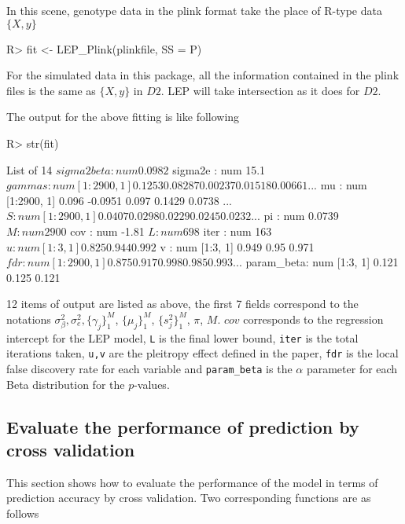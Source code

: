 \documentclass[11pt]{article}
\begin{document}
In this scene,  genotype data in the plink format take the place of R-type data $\{X, y\}$
\begin{Schunk}
\begin{Sinput}
R> fit <- LEP_Plink(plinkfile, SS = P)
\end{Sinput}
\end{Schunk}
For the simulated data in this package, all the information contained in the plink files is the same as $\{X, y\}$ in $D2$. LEP will take intersection as it does for $D2$.



The output for the above fitting is like following
\begin{Schunk}
\begin{Sinput}
R> str(fit)
\end{Sinput}
\begin{Soutput}
List of 14
 $ sigma2beta: num 0.0982
 $ sigma2e   : num 15.1
 $ gammas    : num [1:2900, 1] 0.1253 0.08287 0.00237 0.01518 0.00661 ...
 $ mu        : num [1:2900, 1] 0.096 -0.0951 0.097 0.1429 0.0738 ...
 $ S         : num [1:2900, 1] 0.0407 0.0298 0.0229 0.0245 0.0232 ...
 $ pi        : num 0.0739
 $ M         : num 2900
 $ cov       : num -1.81
 $ L         : num 698
 $ iter      : num 163
 $ u         : num [1:3, 1] 0.825 0.944 0.992
 $ v         : num [1:3, 1] 0.949 0.95 0.971
 $ fdr       : num [1:2900, 1] 0.875 0.917 0.998 0.985 0.993 ...
 $ param_beta: num [1:3, 1] 0.121 0.125 0.121
\end{Soutput}
\end{Schunk}
12 items of output are listed as above, the first 7 fields correspond to the notations $\sigma^2_{\beta},\sigma^2_e, \{\gamma_j\}_1^{M}$, $\{\mu_j\}_1^M$, $\{s^2_j\}_1^M$, $\pi$, $M$. $cov$ corresponds to the regression intercept for the LEP model, \texttt{L} is the final lower bound, \texttt{iter} is the total iterations taken, \texttt{u,v} are the pleitropy effect defined in the paper, \texttt{fdr} is the local false discovery rate for each variable and \texttt{param\_beta} is the $\alpha$ parameter for each Beta distribution for the $p$-values.


\subsection{Evaluate the performance of prediction by cross validation}\label{cross_validation}

This section shows how to evaluate the performance of the model in terms of prediction accuracy by cross validation. Two corresponding functions are as follows
\end{document}

